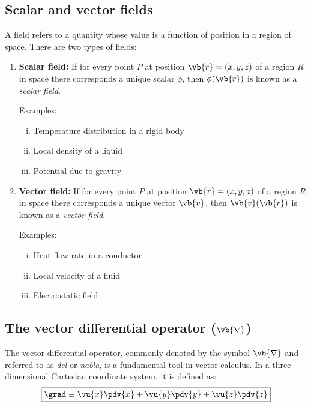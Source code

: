 	\subsection{Scalar and vector fields}
		A field refers to a quantity whose value is a function of position in a region of space. There are two types of fields:
		\begin{enumerate}
			\item \textbf{Scalar field:} If for every point $P$ at position $\vb{r}=(x,y,z)$ of a region $R$ in space there corresponds a unique scalar $\phi$, then $\phi(\vb{r})$ is known as a \textit{scalar field}.
			
			Examples:
			\begin{enumerate}[i.]
				\item Temperature distribution in a rigid body
				\item Local density of a liquid
				\item Potential due to gravity
			\end{enumerate}
			
			\item \textbf{Vector field:} If for every point $P$ at position $\vb{r}=(x,y,z)$ of a region $R$ in space there corresponds a unique vector $\vb{v}$, then $\vb{v}(\vb{r})$ is known as a \textit{vector field}.
			
			Examples:
			\begin{enumerate}[i.]
				\item Heat flow rate in a conductor
				\item Local velocity of a fluid
				\item Electrostatic field
			\end{enumerate}
		\end{enumerate}
		
	\subsection{The vector differential operator ($\vb{\nabla}$)}
		The vector differential operator, commonly denoted by the symbol $\vb{\nabla}$ and referred to as \textit{del} or \textit{nabla}, is a fundamental tool in vector calculus. In a three-dimensional Cartesian coordinate system, it is defined as:
		\begin{align*}
			\boxed{\grad\equiv\vu{x}\pdv{x}+\vu{y}\pdv{y}+\vu{z}\pdv{z}}
		\end{align*}
		

